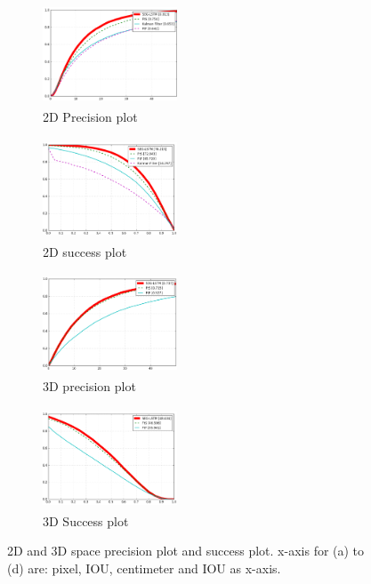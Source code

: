 \documentclass[10pt,twocolumn,letterpaper]{article}
\begin{document}
\begin{figure}[t]
       \centering
        \begin{subfigure}[c]{0.24\textwidth}
        \centering
                \includegraphics[width=4cm,height=3cm, clip]{figures/precision_plot_2d.png}
    \caption{\small{2D Precision plot}}
        \end{subfigure}
        \begin{subfigure}[c]{0.24\textwidth}
        \centering
                \includegraphics[width=4cm,height=3cm, clip]{figures/success_plot_2d.png}
        \caption{\small{2D success plot}}
        \end{subfigure}
       \begin{subfigure}[c]{0.24\textwidth}
        \centering
                \includegraphics[width=4cm,height=3cm, clip]{figures/precision_plot_3d_20cm.png}
    \caption{\small{3D precision plot}}
        \end{subfigure}
               \begin{subfigure}[c]{0.24\textwidth}
        \centering
                \includegraphics[width=4cm,height=3cm, clip]{figures/success_plot_3d.png}
        \caption{\small{3D Success plot}}
        \end{subfigure}
        
\caption{\small{ 2D and 3D space precision plot and success plot. x-axis for (a) to (d) are: pixel, IOU, centimeter and IOU as x-axis.}}
\label{fig:precision_plot_and_success_plot}
\end{figure}
\end{document}
